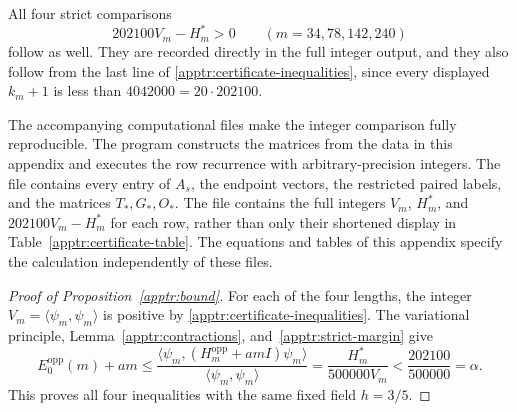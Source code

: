 \documentclass[11pt]{article}
\theoremstyle{remark}
\numberwithin{equation}{section}
\begin{document}
All four strict comparisons
\begin{equation}\label{apptr:strict-margin}
 202100V_m-H_m^*>0
 \qquad(m=34,78,142,240)
\end{equation}
follow as well.  They are recorded directly in the full integer
output, and they also follow from the last line of
\eqref{apptr:certificate-inequalities}, since every displayed
$k_m+1$ is less than $4042000=20\cdot202100$.

The accompanying computational files make the integer comparison
fully reproducible.  The program
 constructs the matrices from
the data in this appendix and executes the row recurrence with
arbitrary-precision integers.  The file
 contains every
entry of $A_s$, the endpoint vectors, the restricted paired labels,
and the matrices $T_*,G_*,O_*$.  The file
 contains the full
integers $V_m$, $H_m^*$, and $202100V_m-H_m^*$ for each row,
rather than only their shortened display in
Table~\ref{apptr:certificate-table}.  The equations and tables of
this appendix specify the calculation independently of these files.

\begin{proof}[Proof of Proposition~\ref{apptr:bound}]
For each of the four lengths, the integer
$V_m=\langle\psi_m,\psi_m\rangle$ is positive by
\eqref{apptr:certificate-inequalities}.  The variational principle,
Lemma~\ref{apptr:contractions}, and~\eqref{apptr:strict-margin} give
\[
 E_0^{\mathrm{opp}}(m)+am
 \le\frac{\langle\psi_m,(H_m^{\mathrm{opp}}+am I)\psi_m\rangle}
          {\langle\psi_m,\psi_m\rangle}
 =\frac{H_m^*}{500000V_m}
 <\frac{202100}{500000}
 =\alpha.
\]
This proves all four inequalities with the same fixed field $h=3/5$.
\end{proof}



\end{document}
